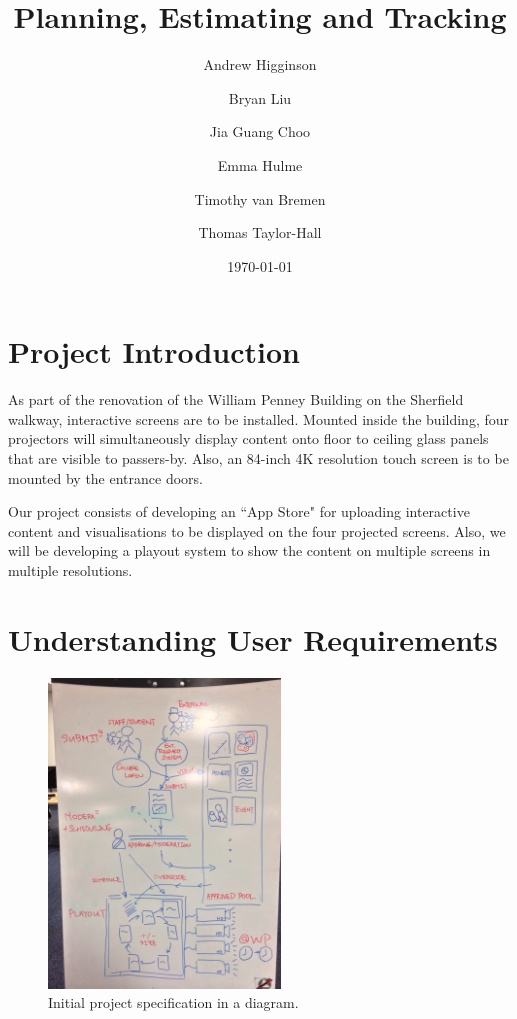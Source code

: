 \documentclass[a4paper]{article}
\begin{document}
\title{Planning, Estimating and Tracking}
\author{Andrew Higginson \and Bryan Liu \and Jia Guang Choo \and Emma Hulme \and 
Timothy van Bremen \and Thomas Taylor-Hall}
\date{\today}
\maketitle

\setcounter{table}{0}
\linespread{1.1}

\section{Project Introduction}
As part of the renovation of the William Penney Building on the Sherfield 
walkway, interactive screens are to be installed. Mounted inside the building, four projectors will simultaneously display content onto floor to ceiling glass
panels that are visible to passers-by. Also, an 84-inch 4K resolution touch 
screen is to be mounted by the entrance doors. 

Our project consists of developing an ``App Store" for uploading interactive content and visualisations to be displayed on the four projected screens. Also, we will be developing a playout system to show the content on multiple screens in multiple resolutions.

\section{Understanding User Requirements}

\begin{figure}[H]
  \centering
    \includegraphics[width = 0.55\textwidth, trim= 0 0.55cm 0 1.4cm, clip]{./planning/userreq.jpg}

  \caption{Initial project specification in a diagram.}
  \label{fig:userreq}
\end{figure}
\end{document}
